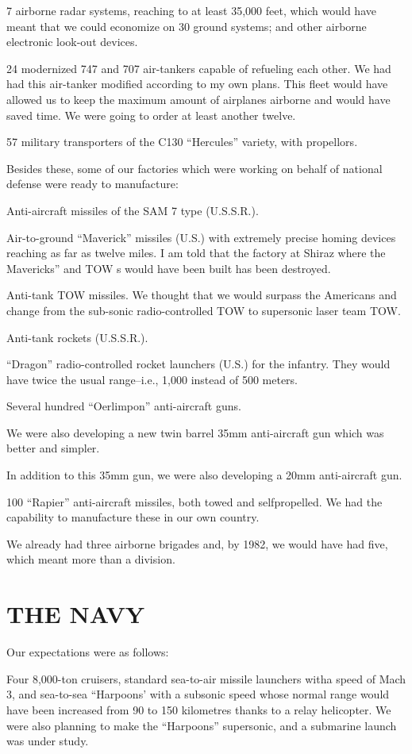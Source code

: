 7 airborne radar systems, reaching to at least 35,000 feet, which would have meant that we could economize on 30 ground systems; and other airborne electronic look-out devices. 

24 modernized 747 and 707 air-tankers capable of refueling each other. We had had this air-tanker modified according to my own plans. This fleet would have allowed us to keep the maximum amount of airplanes airborne and would have saved time. We were going to order at least another twelve. 

57 military transporters of the C130 “Hercules” variety, with propellors. 

Besides these, some of our factories which were working on behalf of national defense were ready to manufacture: 

Anti-aircraft missiles of the SAM 7 type (U.S.S.R.). 

Air-to-ground “Maverick” missiles (U.S.) with extremely precise homing devices reaching as far as twelve miles. I am told that the factory at Shiraz where the Mavericks” and TOW s would have been built has been destroyed. 

Anti-tank TOW missiles. We thought that we would surpass the Americans and change from the sub-sonic radio-controlled TOW to supersonic laser team TOW. 

Anti-tank rockets (U.S.S.R.). 

“Dragon” radio-controlled rocket launchers (U.S.) for the infantry. They would have twice the usual range--i.e., 1,000 instead of 500 meters. 

Several hundred “Oerlimpon” anti-aircraft guns. 

We were also developing a new twin barrel 35mm anti-aircraft gun which was better and simpler. 

In addition to this 35mm gun, we were also developing a 20mm anti-aircraft gun. 

100 “Rapier” anti-aircraft missiles, both towed and selfpropelled. We had the capability to manufacture these in our own country. 

We already had three airborne brigades and, by 1982, we would have had five, which meant more than a division. 

\section*{THE NAVY}
Our expectations were as follows: 

Four 8,000-ton cruisers, standard sea-to-air missile launchers witha speed of Mach 3, and sea-to-sea “Harpoons’ with a subsonic speed whose normal range would have been increased from 90 to 150 kilometres thanks to a relay helicopter. We were also planning to make the “Harpoons” supersonic, and a submarine launch was under study. 

